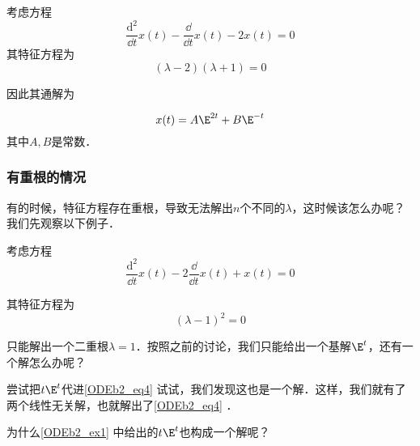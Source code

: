 \begin{example}{}
考虑方程
\begin{equation}
\frac{\mathrm{d}^2}{\dd t}x(t)-\frac{\dd }{\dd t}x(t)-2x(t)=0
\end{equation}
其特征方程为
\begin{equation}
(\lambda-2)(\lambda+1)=0
\end{equation}

因此其通解为

\begin{equation}
x(t)=A\E^{2t}+B\E^{-t}
\end{equation}
其中$A, B$是常数．




\end{example}






\subsubsection{有重根的情况}



有的时候，特征方程存在重根，导致无法解出$n$个不同的$\lambda$，这时候该怎么办呢？我们先观察以下例子．

\begin{example}{}\label{ODEb2_ex1}
考虑方程
\begin{equation}\label{ODEb2_eq4}
\frac{\mathrm{d}^2}{\dd t}x(t)-2\frac{\dd }{\dd t}x(t)+x(t)=0
\end{equation}

其特征方程为
\begin{equation}
(\lambda-1)^2=0
\end{equation}

只能解出一个二重根$\lambda=1$．按照之前的讨论，我们只能给出一个基解$\E^{t}$，还有一个解怎么办呢？

尝试把$t\E^{t}$代进\autoref{ODEb2_eq4} 试试，我们发现这也是一个解．这样，我们就有了两个线性无关解，也就解出了\autoref{ODEb2_eq4} ．




\end{example}




为什么\autoref{ODEb2_ex1} 中给出的$t\E^{t}$也构成一个解呢？

